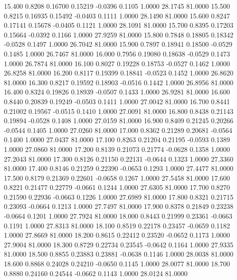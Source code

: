   15.400   0.8208   0.16700   0.15219  -0.0396   0.1105   1.0000  28.1745  81.0000
  15.500   0.8215   0.16935   0.15492  -0.0403   0.1111   1.0000  28.1490  81.0000
  15.600   0.8247   0.17141   0.15678  -0.0405   0.1121   1.0000  28.1091  81.0000
  15.700   0.8395   0.17203   0.15664  -0.0392   0.1166   1.0000  27.9259  81.0000
  15.800   0.7848   0.18805   0.18342  -0.0528   0.1497   1.0000  26.7042  81.0000
  15.900   0.7897   0.18941   0.18500  -0.0529   0.1485   1.0000  26.7467  81.0000
  16.000   0.7956   0.19080   0.18638  -0.0529   0.1473   1.0000  26.7874  81.0000
  16.100   0.8027   0.19228   0.18753  -0.0527   0.1462   1.0000  26.8258  81.0000
  16.200   0.8117   0.19399   0.18841  -0.0523   0.1452   1.0000  26.8620  81.0000
  16.300   0.8217   0.19592   0.18903  -0.0516   0.1442   1.0000  26.8956  81.0000
  16.400   0.8324   0.19826   0.18939  -0.0507   0.1433   1.0000  26.9281  81.0000
  16.600   0.8440   0.20839   0.19249  -0.0503   0.1411   1.0000  27.0042  81.0000
  16.700   0.8441   0.21002   0.19567  -0.0515   0.1410   1.0000  27.0091  81.0000
  16.800   0.8438   0.21143   0.19894  -0.0528   0.1408   1.0000  27.0159  81.0000
  16.900   0.8409   0.21245   0.20266  -0.0544   0.1405   1.0000  27.0260  81.0000
  17.000   0.8362   0.21289   0.20681  -0.0564   0.1400   1.0000  27.0437  81.0000
  17.100   0.8263   0.21204   0.21195  -0.0593   0.1389   1.0000  27.0860  81.0000
  17.200   0.8139   0.21073   0.21774  -0.0628   0.1358   1.0000  27.2043  81.0000
  17.300   0.8126   0.21150   0.22131  -0.0644   0.1323   1.0000  27.3360  81.0000
  17.400   0.8146   0.21259   0.22390  -0.0653   0.1293   1.0000  27.4477  81.0000
  17.500   0.8179   0.21369   0.22601  -0.0658   0.1267   1.0000  27.5458  81.0000
  17.600   0.8221   0.21477   0.22779  -0.0661   0.1244   1.0000  27.6305  81.0000
  17.700   0.8270   0.21590   0.22936  -0.0663   0.1226   1.0000  27.6989  81.0000
  17.800   0.8321   0.21715   0.23093  -0.0664   0.1213   1.0000  27.7497  81.0000
  17.900   0.8378   0.21849   0.23238  -0.0664   0.1201   1.0000  27.7924  81.0000
  18.000   0.8443   0.21999   0.23361  -0.0663   0.1191   1.0000  27.8313  81.0000
  18.100   0.8519   0.22178   0.23457  -0.0659   0.1182   1.0000  27.8669  81.0000
  18.200   0.8615   0.22412   0.23520  -0.0652   0.1173   1.0000  27.9004  81.0000
  18.300   0.8729   0.22734   0.23545  -0.0642   0.1164   1.0000  27.9335  81.0000
  18.500   0.8855   0.23883   0.23881  -0.0638   0.1146   1.0000  28.0038  81.0000
  18.600   0.8868   0.24028   0.24210  -0.0650   0.1145   1.0000  28.0077  81.0000
  18.700   0.8880   0.24160   0.24544  -0.0662   0.1143   1.0000  28.0124  81.0000
